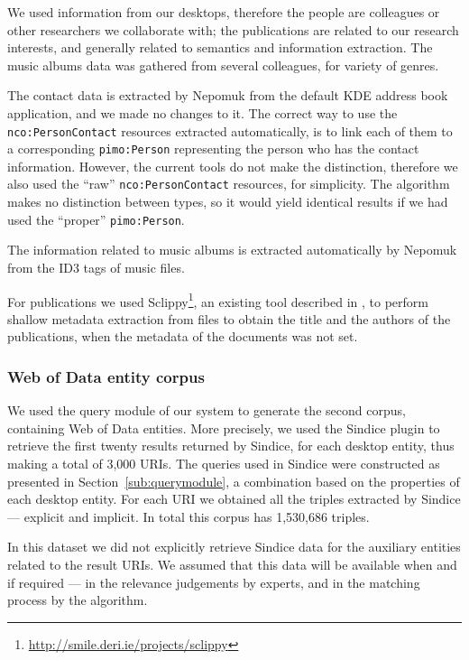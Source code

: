 We used information from our desktops, therefore the people are colleagues or other researchers we collaborate with; the publications are related to our research interests, and generally related to semantics and information extraction. The music albums data was gathered from several colleagues, for variety of genres.

The contact data is extracted by Nepomuk from the default KDE address book application, and we made no changes to it. The correct way to use the \verb|nco:PersonContact| resources extracted automatically, is to link each of them to a corresponding \verb|pimo:Person| representing the person who has the contact information. However, the current tools do not make the distinction, therefore we also used the ``raw'' \verb|nco:PersonContact| resources, for simplicity. The algorithm makes no distinction between types, so it would yield identical results if we had used the ``proper'' \verb|pimo:Person|.  

The information related to music albums is extracted automatically by Nepomuk from the ID3 tags of music files. 

For publications we used Sclippy\footnote{\url{http://smile.deri.ie/projects/sclippy}}, an existing tool described in \cite{Groza2009}, to perform shallow metadata extraction from files to obtain the title and the authors of the publications, when the metadata of the documents was not set.

\subsubsection{Web of Data entity corpus}

We used the query module of our system to generate the second corpus, containing Web of Data entities. More precisely, we used the Sindice plugin to retrieve the first twenty results returned by Sindice, for each desktop entity, thus making a total of 3,000 URIs. The queries used in Sindice were constructed as presented in Section~\ref{sub:querymodule}, a combination based on the properties of each desktop entity. For each URI we obtained all the triples extracted by Sindice --- explicit and implicit. In total this corpus has 1,530,686 triples.

In this dataset we did not explicitly retrieve Sindice data for the auxiliary entities related to the result URIs. We assumed that this data will be available when and if required --- in the relevance judgements by experts, and in the matching process by the algorithm.

